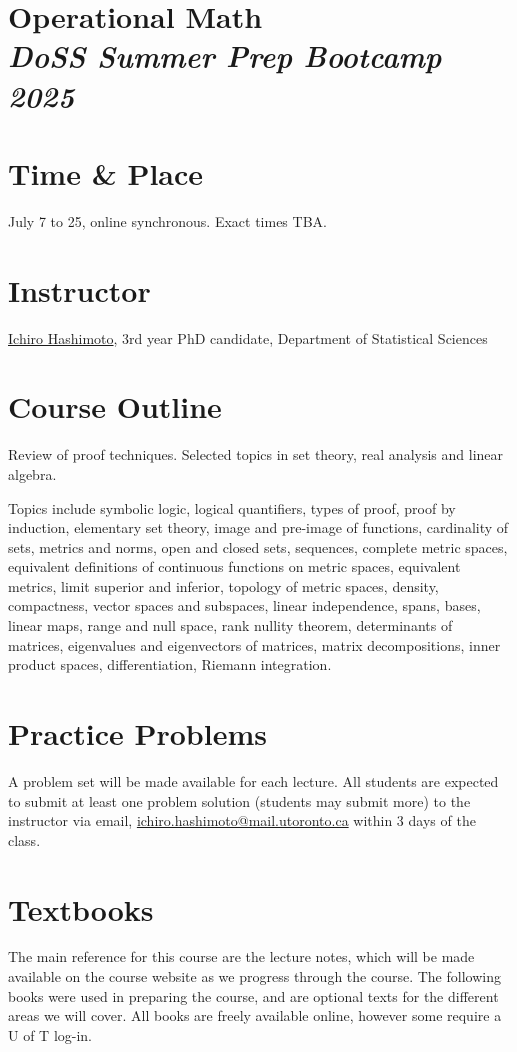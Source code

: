 \documentclass[12pt]{article}
\date{ }
\begin{document}
\section*{Operational Math\\  {\it{DoSS Summer Prep Bootcamp 2025}}}

\section{Time \& Place}
July 7 to 25, online synchronous. Exact times TBA.

\section{Instructor}
\href{mailto:ichiro.hashimoto@mail.utoronto.ca}{Ichiro Hashimoto}, 3rd year PhD candidate, Department of Statistical Sciences


\section{Course Outline}
Review of proof techniques. Selected topics in set theory, real analysis and linear algebra. 

\vspace{1em}

\noindent
Topics include symbolic logic, logical quantifiers, types of proof, proof by induction, elementary set theory, image and pre-image of functions, cardinality of sets, metrics and norms, open and closed sets, sequences, complete metric spaces, equivalent definitions of continuous functions on metric spaces, equivalent metrics, limit superior and inferior, topology of metric spaces, density, compactness, vector spaces and subspaces, linear independence, spans, bases, linear maps, range and null space, rank nullity theorem, determinants of matrices, eigenvalues and eigenvectors of matrices, matrix decompositions, inner product spaces, differentiation, Riemann integration.

\section{Practice Problems}
A problem set will be made available for each lecture. All students are expected to submit at least one problem solution (students may submit more) to the instructor via email, \href{mailto:ichiro.hashimoto@mail.utoronto.ca}{ichiro.hashimoto@mail.utoronto.ca} within 3 days of the class.

\section{Textbooks}
The main reference for this course are the lecture notes, which will be made available on the course website as we progress through the course. The following books were used in preparing the course, and are optional texts for the different areas we will cover. All books are freely available online, however some require a U of T log-in.
\end{document}
